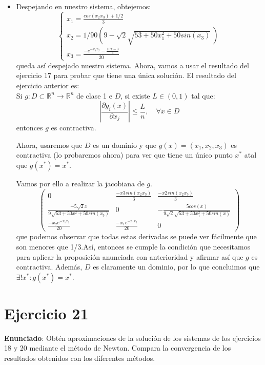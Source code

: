 \documentclass[11pt]{article}
\begin{document}
\begin{itemize}
	\item Despejando en nuestro sistema, obtejemos:
	\[
	\begin{cases}
	x_1 = \frac{cos(x_2x_3) + 1/2}{3}\\
 x_2 = 1/90 (9 - \sqrt2 \sqrt{53 + 50 x_1^2 + 50 sin(x_3)}\ )\\
  x_3 = \frac{-e^{-x_1x_2}- \frac{10\pi-3}{3}}{20}
\end{cases}
	\]
	queda así despejado nuestro sistema.
	Ahora, vamos a usar el resultado del ejercicio 17 para probar que tiene una única solución.
	El resultado del ejercicio anterior es:\\
	Si $g:D\subset \mathbb R^n \to \mathbb R^n$ de clase 1 e $D$, si existe $L \in (0,1)$ tal que:
	\[
	|\dfrac{\partial g_i(x)}{\partial x_j}| \leq \dfrac{L}{n}, \quad \forall x \in D
	\]
	entonces $g$ es contractiva.
	
	Ahora, usaremos que $D$ es un dominio y que $g(x) = (x_1,x_2,x_3)$ es contractiva (lo probaremos ahora) para ver que tiene un único punto $x^*$ atal que $g(x^*) = x^*$.
	
	Vamos por ello a realizar la jacobiana de $g$.
\[	\begin{pmatrix}
    0 & \frac{-x3 sin(x_2x_3)}{3} & \frac{-x2 sin(x_2x_3)}{3}\\
    
  \frac{-5 \sqrt2 x}{9 \sqrt{53 + 50 x^2 + 50 sin(x_3)}}& 0 &  -\frac{5 cos(x)}{9 \sqrt2 \sqrt{53 + 50 x_1^2 + 50 sin(x)}} \\
    
    \frac{-x_2e^{-x_1x_2}}{20} & 
    \frac{-x_1e^{-x_1x_2}}{20} & 0
  \end{pmatrix}
 \]
 que podemos observar que todas estas derivadas se puede ver fácilmente que son menores que 1/3.Así, entonces se cumple la condición que necesitamos para aplicar la proposición anunciada con anterioridad y afirmar así que $g$ es contractiva. Además, $D$ es claramente un dominio, por lo que concluimos que $\exists ! x^* : g(x^*) = x^*$.
\end{itemize}

\section{Ejercicio 21}
\textbf{Enunciado}: Obtén aproximaciones de la solución de los sistemas de los ejercicios 18 y 20 mediante el método de Newton. Compara la convergencia de los resultados obtenidos con los diferentes métodos.
\end{document}
